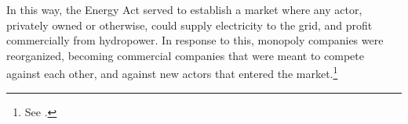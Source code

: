 In this way, the Energy Act served to establish a market where any actor, privately owned or otherwise, could supply electricity to the grid, and profit commercially from hydropower. In response to this, monopoly companies were reorganized, becoming commercial companies that were meant to compete against each other, and against new actors that entered the market.\footnote{See \cite{claes11}.} %
